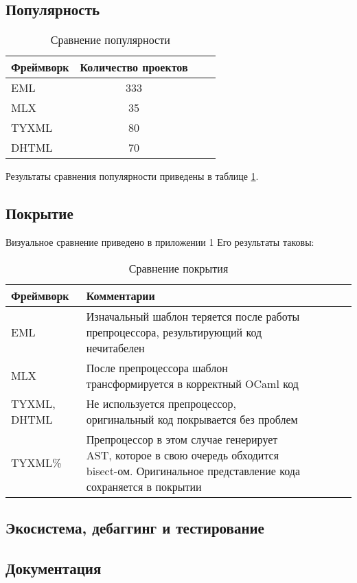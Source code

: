 

\subsection{Популярность}


\begin{table}
    \centering
    \caption{Сравнение популярности}
    \label{tab:popularity-comparison}
    \begin{tabular}{lccc}
        \toprule
        \textbf{Фреймворк} & \textbf{Количество проектов} \\
        \midrule
        EML & 333 \\
        MLX & 35 \\
        TYXML & 80 \\ %
        DHTML & 70 \\
        \bottomrule
    \end{tabular}
\end{table}

Результаты сравнения популярности приведены в таблице \ref{tab:popularity-comparison}.


\subsection{Покрытие}

Визуальное сравнение приведено в приложении 1 %
Его результаты таковы:

\begin{table}[h]
    \centering
    \caption{Сравнение покрытия}
    \label{tab:coverage-comparison}
    \begin{tabularx}{\linewidth}{l>{\raggedright\arraybackslash}X>{\raggedright\arraybackslash}XcXX}
        \toprule
        \textbf{Фреймворк} & \textbf{Комментарии} \\
        \midrule
        EML & \cellcolor{yellow!30} Изначальный шаблон теряется после работы препроцессора, результирующий код нечитабелен \\
        MLX & После препроцессора шаблон трансформируется в корректный OCaml код \\
        TYXML, DHTML & Не используется препроцессор, оригинальный код покрывается без проблем \\
        TYXML\% & Препроцессор в этом случае генерирует AST, которое в свою очередь обходится bisect-ом. Оригинальное представление кода сохраняется в покрытии \\
        \bottomrule
    \end{tabularx}
\end{table}

\subsection{Экосистема, дебаггинг и тестирование}


\subsection{Документация}


